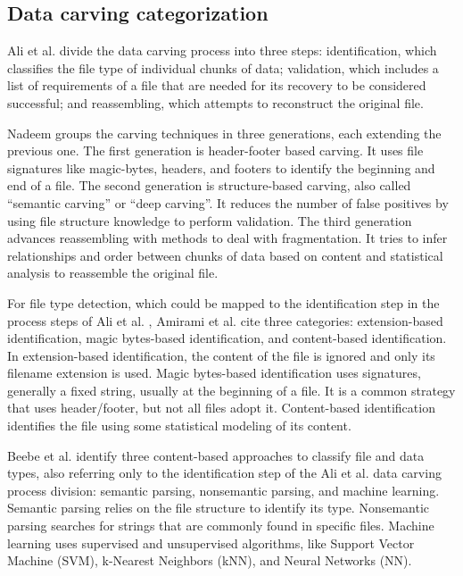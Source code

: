 \subsection{Data carving categorization}
 

Ali et al. \cite{ali_review_2018} divide the data carving process into three steps:
    identification, which classifies the file type of individual chunks of data; 
    validation, which includes a list of requirements of a file that are needed for its recovery to be considered successful; and
    reassembling, which attempts to reconstruct the original file.
    

Nadeem \cite{nadeem_ashraf_forensic_2013} groups the carving techniques in three generations, each extending the previous one.
The first generation is header-footer based carving. It uses file signatures like magic-bytes, headers, and footers to identify the beginning and end of a file.
The second generation is structure-based carving, also called ``semantic carving'' or ``deep carving''. It reduces the number of false positives by using file structure knowledge to perform validation.
The third generation advances reassembling with methods to deal with fragmentation. It tries to infer relationships and order between chunks of data based on content and statistical analysis to reassemble the original file.

For file type detection, which could be mapped to the identification step in the  process steps of Ali et al. \cite{ali_review_2018}, Amirami et al. \cite{amirani_new_2008} cite three categories: extension-based identification, magic bytes-based identification, and content-based identification.
In extension-based identification, the content of the file is ignored and only its filename extension is used. Magic bytes-based identification uses signatures, generally a fixed string, usually at the beginning of a file. It is a common strategy that uses header/footer, but not all files adopt it. Content-based identification identifies the file using some statistical modeling of its content.

Beebe et al. \cite{beebe_sceadan:_2013} identify three content-based approaches to classify file and data types, also referring only to the identification step of the Ali et al. \cite{ali_review_2018} data carving process division: semantic parsing, nonsemantic parsing, and machine learning. Semantic parsing relies on the file structure to identify its type. Nonsemantic parsing searches for strings that are commonly found in specific files. Machine learning uses supervised and unsupervised algorithms, like Support Vector Machine (SVM), k-Nearest Neighbors (kNN), and Neural Networks (NN).

